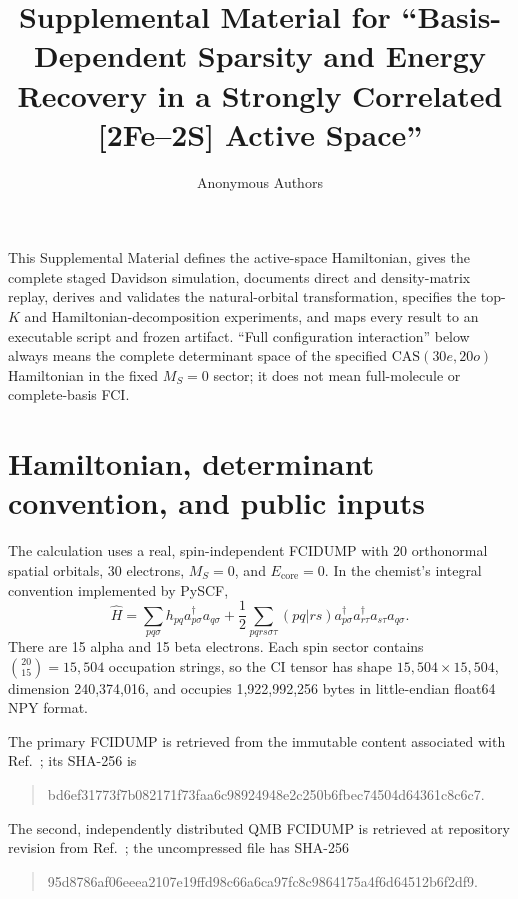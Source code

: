 \documentclass[aps,onecolumn,superscriptaddress,nofootinbib,longbibliography]{revtex4-2}
\newcommand{\cas}{\mathrm{CAS}(30e,20o)}
\begin{document}
\title{Supplemental Material for ``Basis-Dependent Sparsity and Energy Recovery in a Strongly Correlated [2Fe--2S] Active Space''}
\author{Anonymous Authors}
\maketitle

This Supplemental Material defines the active-space Hamiltonian, gives the
complete staged Davidson simulation, documents direct and density-matrix
replay, derives and validates the natural-orbital transformation, specifies the
top-\(K\) and Hamiltonian-decomposition experiments, and maps every result to
an executable script and frozen artifact.  ``Full configuration interaction''
below always means the complete determinant space of the specified \(\cas\)
Hamiltonian in the fixed \(M_S=0\) sector; it does not mean full-molecule or
complete-basis FCI.

\section{Hamiltonian, determinant convention, and public inputs}

The calculation uses a real, spin-independent FCIDUMP with 20 orthonormal
spatial orbitals, 30 electrons, \(M_S=0\), and \(E_{\mathrm{core}}=0\).  In the
chemist's integral convention implemented by PySCF,
\begin{equation}
 \hat H=\sum_{pq\sigma} h_{pq}a^{\dagger}_{p\sigma}a_{q\sigma}
 +\frac{1}{2}\sum_{pqrs\sigma\tau}(pq|rs)
 a^{\dagger}_{p\sigma}a^{\dagger}_{r\tau}a_{s\tau}a_{q\sigma}.
 \label{eq:s-hamiltonian}
\end{equation}
There are 15 alpha and 15 beta electrons.  Each spin sector contains
\(\binom{20}{15}=15{,}504\) occupation strings, so the CI tensor has shape
\(15{,}504\times15{,}504\), dimension 240,374,016, and occupies
1,922,992,256 bytes in little-endian float64 NPY format.

The primary FCIDUMP is retrieved from the immutable content associated with
Ref.~\cite{qatHamiltonian}; its SHA-256 is
\begin{quote}\small\ttfamily
bd6ef31773f7b082171f73faa6c98924948e2c250b6fbec74504d64361c8c6c7.
\end{quote}
The second, independently distributed QMB FCIDUMP is retrieved at repository
revision  from
Ref.~\cite{qmbModels}; the uncompressed file has SHA-256
\begin{quote}\small\ttfamily
95d8786af06eeea2107e19ffd98c66a6ca97fc8c9864175a4f6d64512b6f2df9.
\end{quote}
\end{document}
